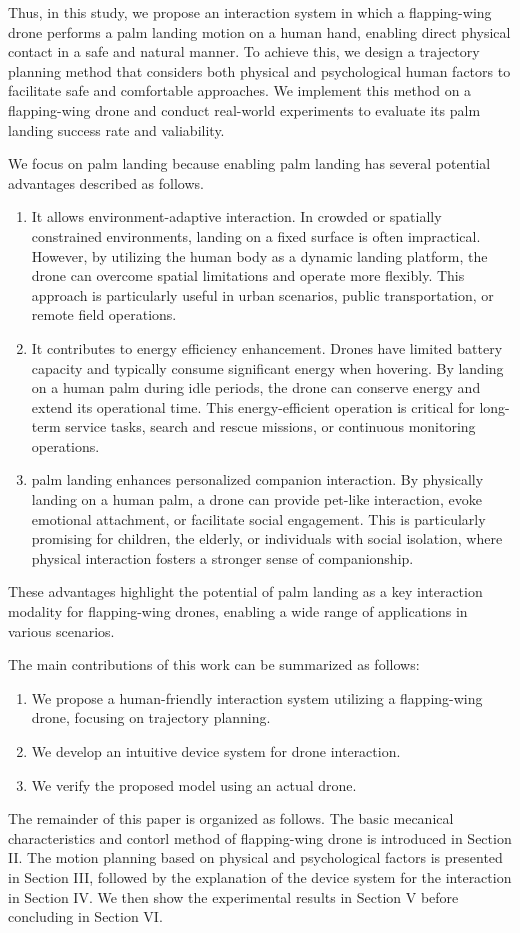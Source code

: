 Thus, in this study, we propose an interaction system in which a flapping-wing drone performs a palm landing motion on a human hand, enabling direct physical contact in a safe and natural manner.  
To achieve this, we design a trajectory planning method that considers both physical and psychological human factors to facilitate safe and comfortable approaches.  
We implement this method on a flapping-wing drone and conduct real-world experiments to evaluate its palm landing success rate and valiability.  

We focus on palm landing because enabling palm landing has several potential advantages described as follows.
\begin{enumerate}
    \item  It allows environment-adaptive interaction.  
    In crowded or spatially constrained environments, landing on a fixed surface is often impractical.  
    However, by utilizing the human body as a dynamic landing platform, the drone can overcome spatial limitations and operate more flexibly.  
    This approach is particularly useful in urban scenarios, public transportation, or remote field operations.
    \item It contributes to energy efficiency enhancement. 
    Drones have limited battery capacity and typically consume significant energy when hovering.  
    By landing on a human palm during idle periods, the drone can conserve energy and extend its operational time.  
    This energy-efficient operation is critical for long-term service tasks, search and rescue missions, or continuous monitoring operations.
    \item palm landing enhances personalized companion interaction.  
    By physically landing on a human palm, a drone can provide pet-like interaction, evoke emotional attachment, or facilitate social engagement.  
    This is particularly promising for children, the elderly, or individuals with social isolation, where physical interaction fosters a stronger sense of companionship.
\end{enumerate}
These advantages highlight the potential of palm landing as a key interaction modality for flapping-wing drones, enabling a wide range of applications in various scenarios.

The main contributions of this work can be summarized as
follows:
\begin{enumerate}
    \item We propose a human-friendly interaction system utilizing a flapping-wing drone, focusing on trajectory planning.
    \item We develop an intuitive device system for drone interaction.
    \item We verify the proposed model using an actual drone.
\end{enumerate}

The remainder of this paper is organized as follows. 
The basic mecanical characteristics and contorl method of flapping-wing drone is introduced in Section II. 
The motion planning based on physical and psychological factors is presented in Section III,
followed by the explanation of the device system for the interaction in Section IV.
We then show the experimental results in Section V before concluding in Section VI.